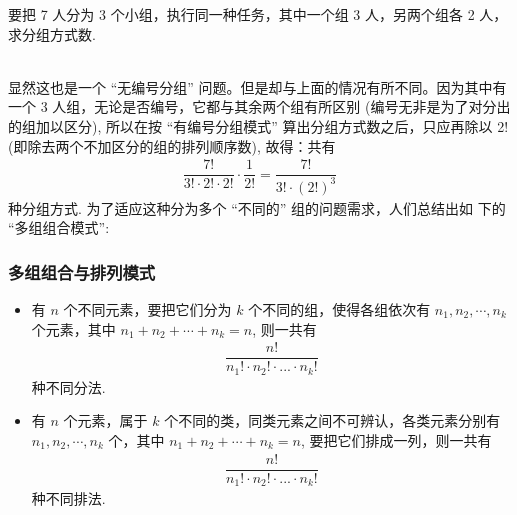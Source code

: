 	\begin{frame}
		\begin{exam}
			要把 7 人分为 3 个小组，执行同一种任务，其中一个组 3 人，另两个组各 2 人，求分组方式数.
		\end{exam}\\

		\pause
		\jieda 显然这也是一个 “无编号分组” 问题。但是却与上面的情况有所不同。因为其中有一个 3 人组，无论是否编号，它都与其余两个组有所区别 (编号无非是为了对分出的组加以区分), 所以在按 “有编号分组模式” 算出分组方式数之后，只应再除以 2! (即除去两个不加区分的组的排列顺序数), \pause 故得：共有
		\begin{eqnarray*}
			\dfrac{7!}{3!\cdot 2! \cdot 2!}\cdot \dfrac{1}{2!}=\dfrac{7!}{ 3! \cdot (2!)^3}
		\end{eqnarray*}
		种分组方式.
		为了适应这种分为多个 “不同的” 组的问题需求，人们总结出如
		下的 “多组组合模式”:
	\end{frame}

	\begin{frame}
		\frametitle{多组组合与排列模式}

		\begin{itemize}[<+-|alert@+>]
			\item {} 有 $n$ 个不同元素，要把它们分为 $k$ 个不同的组，使得各组依次有 $n_1, n_2,\cdots, n_k$ 个元素，其中 $n_1+n_2+\cdots+n_k = n$, 则一共有
			\begin{eqnarray*}
				\dfrac{n!}{n_1! \cdot  n_2! \cdot ... \cdot  n_k!}
			\end{eqnarray*}
			种不同分法.

			\item {} 有 $n$ 个元素，属于 $k$ 个不同的类，同类元素之间不可辨认，各类元素分别有 $n_1, n_2, \cdots, n_k$ 个，其中 $n_1 +n_2 +\cdots+n_k = n$, 要把它们排成一列，则一共有
			\begin{eqnarray*}
				\dfrac{n!}{n_1! \cdot  n_2! \cdot ... \cdot  n_k!}
			\end{eqnarray*} 种不同排法.
		\end{itemize}
	\end{frame}


